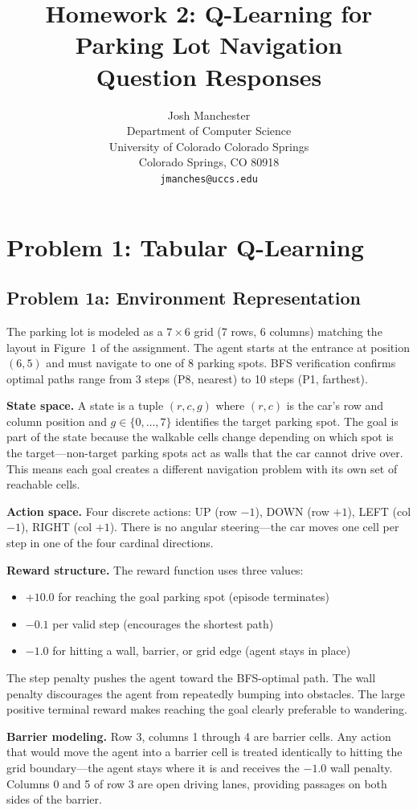 \documentclass[letterpaper]{article}
\title{Homework 2: Q-Learning for Parking Lot Navigation\\Question Responses}
\author{
    Josh Manchester\\
    Department of Computer Science\\
    University of Colorado Colorado Springs\\
    Colorado Springs, CO 80918\\
    \texttt{jmanches@uccs.edu}
}
\begin{document}
\maketitle

\section{Problem 1: Tabular Q-Learning}

\subsection{Problem 1a: Environment Representation}

The parking lot is modeled as a $7 \times 6$ grid (7 rows, 6 columns) matching the layout in Figure~1 of the assignment. The agent starts at the entrance at position $(6, 5)$ and must navigate to one of 8 parking spots. BFS verification confirms optimal paths range from 3 steps (P8, nearest) to 10 steps (P1, farthest).

\textbf{State space.} A state is a tuple $(r, c, g)$ where $(r, c)$ is the car's row and column position and $g \in \{0, \ldots, 7\}$ identifies the target parking spot. The goal is part of the state because the walkable cells change depending on which spot is the target---non-target parking spots act as walls that the car cannot drive over. This means each goal creates a different navigation problem with its own set of reachable cells.

\textbf{Action space.} Four discrete actions: UP (row $-1$), DOWN (row $+1$), LEFT (col $-1$), RIGHT (col $+1$). There is no angular steering---the car moves one cell per step in one of the four cardinal directions.

\textbf{Reward structure.} The reward function uses three values:
\begin{itemize}
    \item $+10.0$ for reaching the goal parking spot (episode terminates)
    \item $-0.1$ per valid step (encourages the shortest path)
    \item $-1.0$ for hitting a wall, barrier, or grid edge (agent stays in place)
\end{itemize}
The step penalty pushes the agent toward the BFS-optimal path. The wall penalty discourages the agent from repeatedly bumping into obstacles. The large positive terminal reward makes reaching the goal clearly preferable to wandering.

\textbf{Barrier modeling.} Row 3, columns 1 through 4 are barrier cells. Any action that would move the agent into a barrier cell is treated identically to hitting the grid boundary---the agent stays where it is and receives the $-1.0$ wall penalty. Columns 0 and 5 of row 3 are open driving lanes, providing passages on both sides of the barrier.
\end{document}
